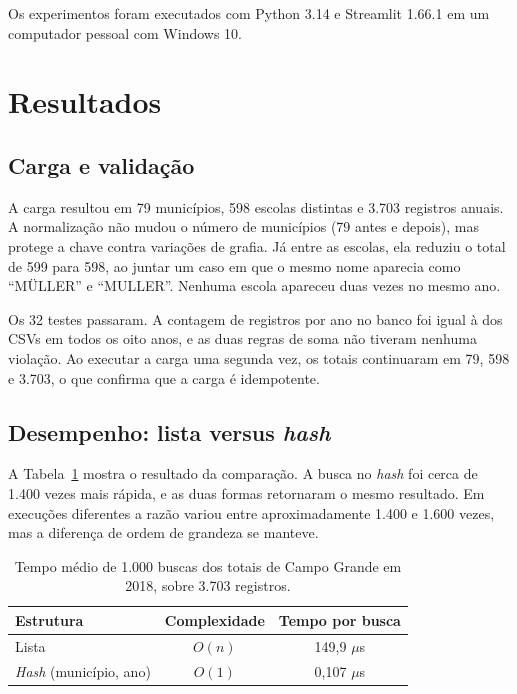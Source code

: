 \documentclass[preprint,10pt,5p]{elsarticle}
\begin{document}
Os experimentos foram executados com Python 3.14 e Streamlit 1.66.1 em um computador pessoal com Windows 10.




\section{Resultados}
\label{results}

\subsection{Carga e validação}

A carga resultou em 79 municípios, 598 escolas distintas e 3.703 registros anuais. A normalização não mudou o número de municípios (79 antes e depois), mas protege a chave contra variações de grafia. Já entre as escolas, ela reduziu o total de 599 para 598, ao juntar um caso em que o mesmo nome aparecia como ``MÜLLER'' e ``MULLER''. Nenhuma escola apareceu duas vezes no mesmo ano.

Os 32 testes passaram. A contagem de registros por ano no banco foi igual à dos CSVs em todos os oito anos, e as duas regras de soma não tiveram nenhuma violação. Ao executar a carga uma segunda vez, os totais continuaram em 79, 598 e 3.703, o que confirma que a carga é idempotente.

\subsection{Desempenho: lista versus \textit{hash}}

A Tabela~\ref{table:busca} mostra o resultado da comparação. A busca no \textit{hash} foi cerca de 1.400 vezes mais rápida, e as duas formas retornaram o mesmo resultado. Em execuções diferentes a razão variou entre aproximadamente 1.400 e 1.600 vezes, mas a diferença de ordem de grandeza se manteve.

\begin{table}[h!]
\centering
\caption{Tempo médio de 1.000 buscas dos totais de Campo Grande em 2018, sobre 3.703 registros.}
\label{table:busca}
\begin{tabular}{lcc}
\toprule
Estrutura & Complexidade & Tempo por busca \\
\midrule
Lista & $O(n)$ & 149,9 $\mu$s \\
\textit{Hash} (município, ano) & $O(1)$ & 0,107 $\mu$s \\
\bottomrule
\end{tabular}
\end{table}
\end{document}

